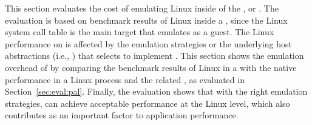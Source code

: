 This section evaluates the cost
of emulating Linux \linuxapis{} inside of the \graphene{} \libos{},
or \thelibos{}.
The evaluation is based on benchmark results
of Linux \linuxapis{} inside a \picoproc{},
since the Linux system call table is the main target that \thelibos{} emulates
as a guest.
The Linux \linuxapis{} performance
on \thelibos{}
is affected by the emulation strategies
or the underlying host abstractions (i.e., \hostapis{})
that \thelibos{}
selects to implement \linuxapis{}.
This section
shows the emulation overhead of \thelibos{}
by comparing the benchmark results
of Linux \linuxapis{} in a \picoproc{} with the native \linuxapi{ } performance in a Linux process
and the related \hostapis{}, as evaluated in Section~\ref{sec:eval:pal}.
Finally,
the evaluation shows that with the right emulation strategies,
\thelibos{} can achieve acceptable performance at the Linux \linuxapi{} level,
which also contributes as an important factor to
application performance.





